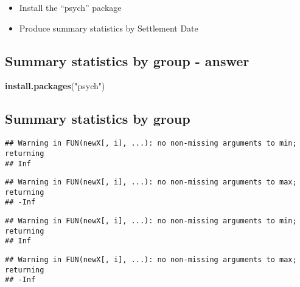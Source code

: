 \documentclass[]{article}
\newenvironment{Shaded}{\begin{snugshade}}{\end{snugshade}}
\newcommand{\KeywordTok}[1]{\textcolor[rgb]{0.13,0.29,0.53}{\textbf{#1}}}
\newcommand{\StringTok}[1]{\textcolor[rgb]{0.31,0.60,0.02}{#1}}
\newcommand{\OperatorTok}[1]{\textcolor[rgb]{0.81,0.36,0.00}{\textbf{#1}}}
\newcommand{\NormalTok}[1]{#1}
\providecommand{\tightlist}{%
  \setlength{\itemsep}{0pt}\setlength{\parskip}{0pt}}
\begin{document}
\begin{itemize}
\tightlist
\item
  Install the ``psych'' package
\item
  Produce summary statistics by Settlement Date
\end{itemize}

\subsection{Summary statistics by group -
answer}\label{summary-statistics-by-group---answer}

\begin{Shaded}
\begin{Highlighting}[]
\KeywordTok{install.packages}\NormalTok{(}\StringTok{"psych"}\NormalTok{)}
\end{Highlighting}
\end{Shaded}

\begin{Shaded}
\end{Shaded}

\subsection{Summary statistics by
group}\label{summary-statistics-by-group-1}

\begin{verbatim}
## Warning in FUN(newX[, i], ...): no non-missing arguments to min; returning
## Inf
\end{verbatim}

\begin{verbatim}
## Warning in FUN(newX[, i], ...): no non-missing arguments to max; returning
## -Inf
\end{verbatim}

\begin{verbatim}
## Warning in FUN(newX[, i], ...): no non-missing arguments to min; returning
## Inf
\end{verbatim}

\begin{verbatim}
## Warning in FUN(newX[, i], ...): no non-missing arguments to max; returning
## -Inf
\end{verbatim}
\end{document}
